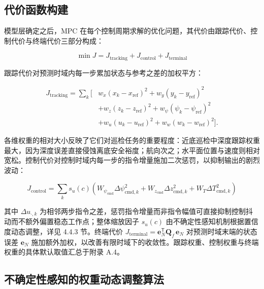 \subsection{代价函数构建}\label{sec:ch04-4-4-2}

模型层确定之后，MPC 在每个控制周期求解的优化问题，其代价由跟踪代价、控制代价与终端代价三部分构成：

\begin{equation}
\min J = J_{\mathrm{tracking}}+J_{\mathrm{control}}+J_{\mathrm{terminal}}
\label{eq:ch04-cost-decomposition}
\end{equation}

跟踪代价对预测时域内每一步累加状态与参考之差的加权平方：

\begin{equation}
\begin{aligned}
J_{\mathrm{tracking}}=\sum_k \bigl[
&w_x(x_k-x_{\mathrm{ref}})^2+w_y(y_k-y_{\mathrm{ref}})^2 \\
&+w_z(z_k-z_{\mathrm{ref}})^2+w_\psi(\psi_k-\psi_{\mathrm{ref}})^2 \\
&+w_u(u_k-u_{\mathrm{ref}})^2+w_w(w_k-w_{\mathrm{ref}})^2
\bigr].
\end{aligned}
\label{eq:ch04-tracking-cost}
\end{equation}

各维权重的相对大小反映了它们对巡检任务的重要程度：近底巡检中深度跟踪权重最大，因为深度误差直接侵蚀离底安全裕度；航向次之；水平面位置与速度则相对宽松。控制代价对控制时域内每一步的指令增量施加二次惩罚，以抑制输出的剧烈波动：

\begin{equation}
J_{\mathrm{control}}
=\sum_k s_u(c)\left(
W_{\psi_{\mathrm{cmd}}}\Delta\psi_{\mathrm{cmd},k}^2
+W_{z_{\mathrm{cmd}}}\Delta z_{\mathrm{cmd},k}^2
+W_T \Delta T_{\mathrm{cmd},k}^2
\right)
\label{eq:ch04-control-cost}
\end{equation}

其中 \(\Delta u_{\cdot,k}\) 为相邻两步指令之差，惩罚指令增量而非指令幅值可直接抑制控制抖动而不额外偏置稳态工作点；整体缩放因子 \(s_u(c)\) 由不确定性感知机制根据置信度动态调整，详见 4.4.3 节。终端代价 \(J_{\mathrm{terminal}}=\mathbf{e}_N^{\mathsf T}\mathbf{Q}_f\,\mathbf{e}_N\) 对预测时域末端的状态误差 \(\mathbf{e}_N\) 施加额外加权，以改善有限时域下的收敛性。跟踪权重、控制权重与终端权重的具体默认取值汇总于附录 A.4。

\subsection{不确定性感知的权重动态调整算法}\label{sec:ch04-4-4-3}

